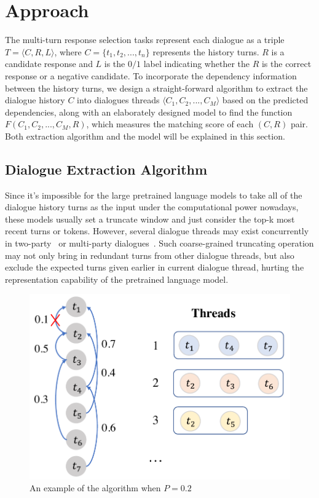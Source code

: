 \section{Approach}
\newcommand{\ROY}[1]{\textcolor{blue}{Roy: #1}}


The multi-turn response selection tasks represent each dialogue as a triple $T=\langle C, R, L\rangle$, where $C=\{t_1, t_2,...,t_n\}$ represents the history turns. $R$ is a candidate response and $L$ is the $0/1$ label indicating whether the $R$ is the correct response or a negative candidate. To incorporate the dependency information between the history turns, we design a straight-forward algorithm to extract the dialogue history $C$ into dialogues threads $\langle C_1, C_2, ..., C_M\rangle$ based on the predicted dependencies, along with an elaborately designed model to find the function $F(C_1, C_2, ..., C_M, R)$, which measures the matching score of each $(C, R)$ pair. Both extraction algorithm and the model will be explained in this section.

\subsection{Dialogue Extraction Algorithm}
\label{sec:DSA}
Since it's impossible for the large pretrained language models to take all of the dialogue history turns as the input under the computational power nowadays, these models usually set a truncate window and just consider the top-k most recent turns or tokens. However, several dialogue threads may exist concurrently in two-party~\cite{DuPX17} or multi-party dialogues~\cite{TanWGWPGCY19}. Such coarse-grained truncating operation may not only bring in redundant turns from 
other dialogue threads, but also exclude the expected turns given earlier 
in current dialogue thread, hurting the representation capability of 
the pretrained language model.

\begin{figure}
	\centering
	\includegraphics[scale=0.42]{pic/algorithm.pdf}
	\caption{An example of the algorithm when $P=0.2$}
	\label{fig:algorithm}
\end{figure}


